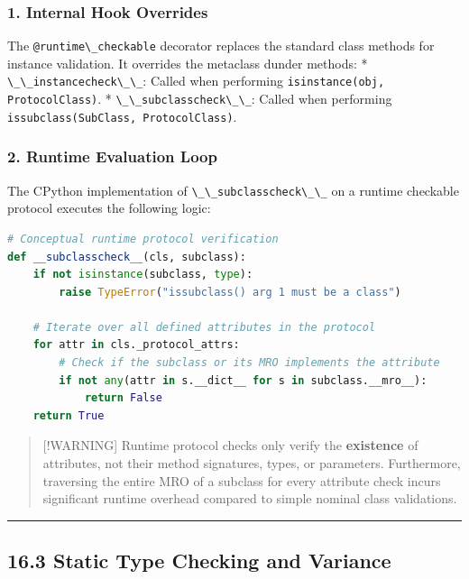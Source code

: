 \hypertarget{internal-hook-overrides}{%
\subsubsection{1. Internal Hook
Overrides}\label{internal-hook-overrides}}

The \passthrough{\lstinline!@runtime\_checkable!} decorator replaces the
standard class methods for instance validation. It overrides the
metaclass dunder methods: *
\passthrough{\lstinline!\_\_instancecheck\_\_!}: Called when performing
\passthrough{\lstinline!isinstance(obj, ProtocolClass)!}. *
\passthrough{\lstinline!\_\_subclasscheck\_\_!}: Called when performing
\passthrough{\lstinline!issubclass(SubClass, ProtocolClass)!}.

\hypertarget{runtime-evaluation-loop}{%
\subsubsection{2. Runtime Evaluation
Loop}\label{runtime-evaluation-loop}}

The CPython implementation of
\passthrough{\lstinline!\_\_subclasscheck\_\_!} on a runtime checkable
protocol executes the following logic:

\begin{lstlisting}[language=Python]
# Conceptual runtime protocol verification
def __subclasscheck__(cls, subclass):
    if not isinstance(subclass, type):
        raise TypeError("issubclass() arg 1 must be a class")
    
    # Iterate over all defined attributes in the protocol
    for attr in cls._protocol_attrs:
        # Check if the subclass or its MRO implements the attribute
        if not any(attr in s.__dict__ for s in subclass.__mro__):
            return False
    return True
\end{lstlisting}

\begin{quote}
{[}!WARNING{]} Runtime protocol checks only verify the
\textbf{existence} of attributes, not their method signatures, types, or
parameters. Furthermore, traversing the entire MRO of a subclass for
every attribute check incurs significant runtime overhead compared to
simple nominal class validations.
\end{quote}

\begin{center}\rule{0.5\linewidth}{0.5pt}\end{center}

\hypertarget{static-type-checking-and-variance}{%
\subsection{16.3 Static Type Checking and
Variance}\label{static-type-checking-and-variance}}

